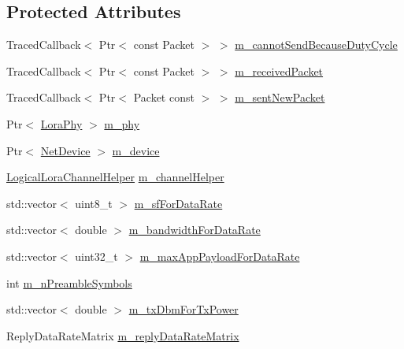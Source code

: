 \subsection*{Protected Attributes}
\begin{DoxyCompactItemize}
\item 
Traced\+Callback$<$ Ptr$<$ const Packet $>$ $>$ \hyperlink{classns3_1_1lorawan_1_1LoraMac_a18ac5a42fe1cf9284f13b024811ea251}{m\+\_\+cannot\+Send\+Because\+Duty\+Cycle}
\item 
Traced\+Callback$<$ Ptr$<$ const Packet $>$ $>$ \hyperlink{classns3_1_1lorawan_1_1LoraMac_ab23af7950870011cad7498021b61bdb2}{m\+\_\+received\+Packet}
\item 
Traced\+Callback$<$ Ptr$<$ Packet const  $>$ $>$ \hyperlink{classns3_1_1lorawan_1_1LoraMac_a1a4ecee82558b1797b83dd0f459fae29}{m\+\_\+sent\+New\+Packet}
\item 
Ptr$<$ \hyperlink{classns3_1_1lorawan_1_1LoraPhy}{Lora\+Phy} $>$ \hyperlink{classns3_1_1lorawan_1_1LoraMac_ab4e9cb7badca494b708d3f46629ab3bd}{m\+\_\+phy}
\item 
Ptr$<$ \hyperlink{classNetDevice}{Net\+Device} $>$ \hyperlink{classns3_1_1lorawan_1_1LoraMac_a81e93dafb6adf6ff9c871aaae403e9a6}{m\+\_\+device}
\item 
\hyperlink{classns3_1_1lorawan_1_1LogicalLoraChannelHelper}{Logical\+Lora\+Channel\+Helper} \hyperlink{classns3_1_1lorawan_1_1LoraMac_a7248ac03ba4be5a4391fd9a63b92debe}{m\+\_\+channel\+Helper}
\item 
std\+::vector$<$ uint8\+\_\+t $>$ \hyperlink{classns3_1_1lorawan_1_1LoraMac_ac8d1d1df404002ef578133d4ed5562ee}{m\+\_\+sf\+For\+Data\+Rate}
\item 
std\+::vector$<$ double $>$ \hyperlink{classns3_1_1lorawan_1_1LoraMac_a552da80de353193c4021988b402904ec}{m\+\_\+bandwidth\+For\+Data\+Rate}
\item 
std\+::vector$<$ uint32\+\_\+t $>$ \hyperlink{classns3_1_1lorawan_1_1LoraMac_a8e62781e3821750f10b1f242a2dcaef7}{m\+\_\+max\+App\+Payload\+For\+Data\+Rate}
\item 
int \hyperlink{classns3_1_1lorawan_1_1LoraMac_ab6688afd97e13515d365fd43e6886b5d}{m\+\_\+n\+Preamble\+Symbols}
\item 
std\+::vector$<$ double $>$ \hyperlink{classns3_1_1lorawan_1_1LoraMac_a3b34787f91543563ad0b989fe067120b}{m\+\_\+tx\+Dbm\+For\+Tx\+Power}
\item 
Reply\+Data\+Rate\+Matrix \hyperlink{classns3_1_1lorawan_1_1LoraMac_a3ba98173062c0f853dfdd70cba444203}{m\+\_\+reply\+Data\+Rate\+Matrix}
\end{DoxyCompactItemize}


